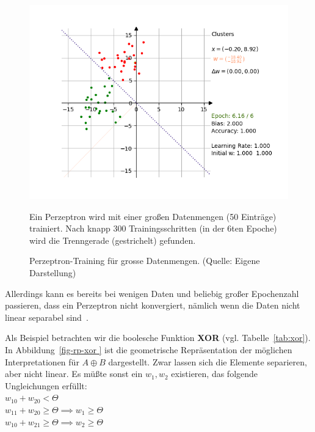 \begin{figure}[h]
    \begin{center}
    \includegraphics{images/rosenblatt/blob_success.png}
    \caption{Perzeptron-Training für grosse Datenmengen. (Quelle: Eigene Darstellung)}
    \label{fig-rp-blobs}
    \end{center}
    \small Ein Perzeptron wird mit einer großen Datenmengen (50 Einträge) trainiert. Nach knapp 300 Trainingsschritten (in der 6ten Epoche) wird die Trenngerade (gestrichelt) gefunden.
\end{figure}

\noindent
Allerdings kann es bereits bei wenigen Daten und beliebig großer Epochenzahl passieren, dass ein Perzeptron nicht konvergiert, nämlich wenn die Daten nicht linear separabel sind~\cite[20]{Arb03}.

Als Beispiel betrachten wir die boolesche Funktion \textbf{XOR} (vgl. Tabelle~\ref{tab:xor}). In Abbildung~\ref{fig-rp-xor } ist die geometrische Repräsentation der möglichen Interpretationen für $A \oplus B$ dargestellt.
Zwar lassen sich die Elemente separieren, aber nicht linear.
Es müßte sonst ein $w_1, w_2$ existieren, das folgende Ungleichungen erfüllt:\\


$w_10 + w_20 < \Theta$\\

$w_11 + w_20 \geq \Theta \implies w_1 \geq \Theta$\\

$w_10 + w_21 \geq \Theta \implies w_2 \geq \Theta$\\

